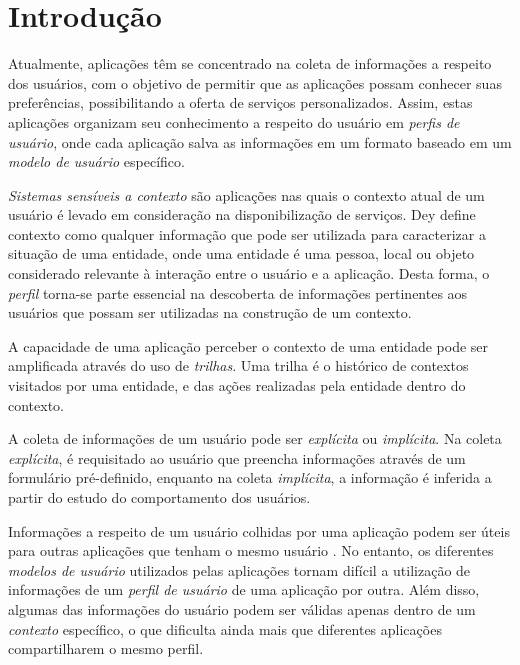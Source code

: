 \documentclass[a4paper]{article}
\author{André Wagner}
\title{}
\begin{document}


\section{Introdução}


Atualmente, aplicações têm se concentrado na coleta de informações a respeito dos usuários, com o objetivo de permitir que as aplicações possam conhecer suas preferências, possibilitando a oferta de serviços personalizados. Assim, estas aplicações organizam seu conhecimento a respeito do usuário em \emph{perfis de usuário}, onde cada aplicação salva as informações em um formato baseado em um \emph{modelo de usuário} específico.\cite{viviani10}

\emph{Sistemas sensíveis a contexto} são aplicações nas quais o contexto atual de um usuário é levado em consideração na disponibilização de serviços. Dey\cite{dey2001} define contexto como qualquer informação que pode ser utilizada para caracterizar a situação de uma entidade, onde uma entidade é uma pessoa, local ou objeto considerado relevante à interação entre o usuário e a aplicação. Desta forma, o \emph{perfil} torna-se parte essencial na descoberta de informações pertinentes aos usuários que possam ser utilizadas na construção de um contexto.

A capacidade de uma aplicação perceber o contexto de uma entidade 
pode ser amplificada através do uso de \emph{trilhas}\cite{silva09}. Uma trilha é o histórico de contextos visitados por uma entidade, e das ações realizadas pela entidade dentro do contexto.


A coleta de informações de um usuário pode ser \emph{explícita} ou \emph{implícita}\cite{viviani10}. Na coleta \emph{explícita}, é requisitado ao usuário que preencha informações através de um formulário pré-definido, enquanto na coleta \emph{implícita}, a informação é inferida a partir do estudo do comportamento dos usuários.

Informações a respeito de um usuário colhidas por uma aplicação podem ser úteis para outras aplicações que tenham o mesmo usuário \cite{viviani10}. No entanto, os diferentes \emph{modelos de usuário} utilizados pelas aplicações tornam difícil a utilização de informações de um \emph{perfil de usuário} de uma aplicação por outra. Além disso, algumas das informações do usuário podem ser válidas apenas dentro de um \emph{contexto} específico, o que dificulta ainda mais que diferentes aplicações compartilharem o mesmo perfil.
\end{document}
